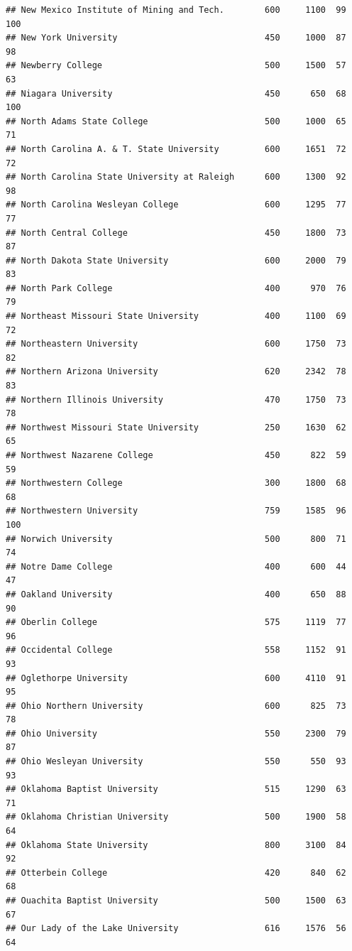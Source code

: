 \documentclass[
]{article}
\begin{document}
\begin{verbatim}
## New Mexico Institute of Mining and Tech.        600     1100  99      100
## New York University                             450     1000  87       98
## Newberry College                                500     1500  57       63
## Niagara University                              450      650  68      100
## North Adams State College                       500     1000  65       71
## North Carolina A. & T. State University         600     1651  72       72
## North Carolina State University at Raleigh      600     1300  92       98
## North Carolina Wesleyan College                 600     1295  77       77
## North Central College                           450     1800  73       87
## North Dakota State University                   600     2000  79       83
## North Park College                              400      970  76       79
## Northeast Missouri State University             400     1100  69       72
## Northeastern University                         600     1750  73       82
## Northern Arizona University                     620     2342  78       83
## Northern Illinois University                    470     1750  73       78
## Northwest Missouri State University             250     1630  62       65
## Northwest Nazarene College                      450      822  59       59
## Northwestern College                            300     1800  68       68
## Northwestern University                         759     1585  96      100
## Norwich University                              500      800  71       74
## Notre Dame College                              400      600  44       47
## Oakland University                              400      650  88       90
## Oberlin College                                 575     1119  77       96
## Occidental College                              558     1152  91       93
## Oglethorpe University                           600     4110  91       95
## Ohio Northern University                        600      825  73       78
## Ohio University                                 550     2300  79       87
## Ohio Wesleyan University                        550      550  93       93
## Oklahoma Baptist University                     515     1290  63       71
## Oklahoma Christian University                   500     1900  58       64
## Oklahoma State University                       800     3100  84       92
## Otterbein College                               420      840  62       68
## Ouachita Baptist University                     500     1500  63       67
## Our Lady of the Lake University                 616     1576  56       64

\end{verbatim}
\end{document}

